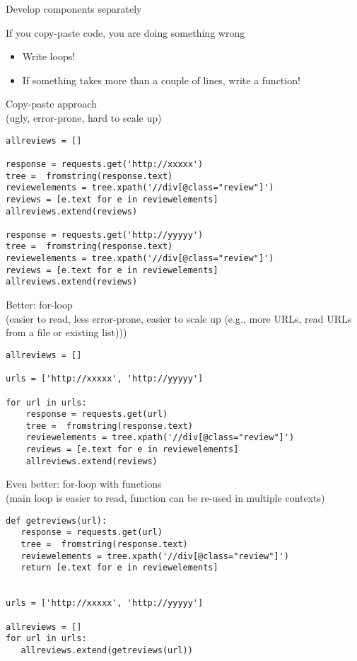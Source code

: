 \documentclass[compress]{beamer}
\begin{document}
\begin{frame}{Develop components separately}
	\begin{block}{If you copy-paste code, you are doing something wrong}
		\begin{itemize}[<+->]
			\item Write loops!
			\item If something takes more than a couple of lines, write a function!
		\end{itemize}
	\end{block}
\end{frame}

\begin{frame}
Copy-paste approach\\ (ugly, error-prone, hard to scale up)
\begin{verbatim}
allreviews = []

response = requests.get('http://xxxxx')
tree =  fromstring(response.text)
reviewelements = tree.xpath('//div[@class="review"]')
reviews = [e.text for e in reviewelements]
allreviews.extend(reviews)

response = requests.get('http://yyyyy')
tree =  fromstring(response.text)
reviewelements = tree.xpath('//div[@class="review"]')
reviews = [e.text for e in reviewelements]
allreviews.extend(reviews)
\end{verbatim}
\end{frame}


\begin{frame}
Better: for-loop\\ (easier to read, less error-prone, easier to scale up (e.g., more URLs, read URLs from a file or existing list)))
\begin{verbatim}
allreviews = []

urls = ['http://xxxxx', 'http://yyyyy']

for url in urls:
    response = requests.get(url)
    tree =  fromstring(response.text)
    reviewelements = tree.xpath('//div[@class="review"]')
    reviews = [e.text for e in reviewelements]
    allreviews.extend(reviews)
\end{verbatim}
\end{frame}




\begin{frame}
Even better: for-loop with functions\\ (main loop is easier to read, function can be re-used in multiple contexts)
\begin{verbatim}
def getreviews(url):
   response = requests.get(url)
   tree =  fromstring(response.text)
   reviewelements = tree.xpath('//div[@class="review"]')
   return [e.text for e in reviewelements]


urls = ['http://xxxxx', 'http://yyyyy']

allreviews = []
for url in urls:
   allreviews.extend(getreviews(url))
\end{verbatim}
\end{frame}
\end{document}
